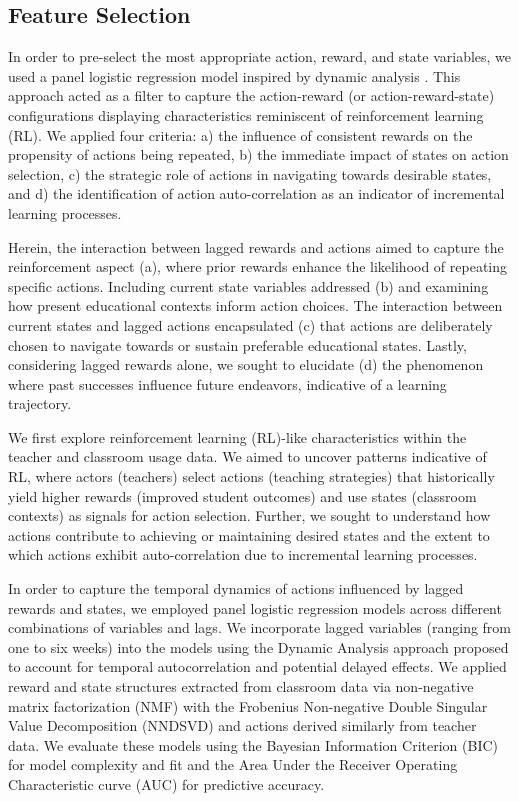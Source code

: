\documentclass[
  number,
  preprint,
  3p,
  onecolumn]{elsarticle}
\begin{document}
\subsection{Feature Selection}\label{feature-selection}

In order to pre-select the most appropriate action, reward, and state
variables, we used a panel logistic regression model inspired by dynamic
analysis \citep{lau2005}. This approach acted as a filter to capture the
action-reward (or action-reward-state) configurations displaying
characteristics reminiscent of reinforcement learning (RL). We applied
four criteria: a) the influence of consistent rewards on the propensity
of actions being repeated, b) the immediate impact of states on action
selection, c) the strategic role of actions in navigating towards
desirable states, and d) the identification of action auto-correlation
as an indicator of incremental learning processes.

Herein, the interaction between lagged rewards and actions aimed to
capture the reinforcement aspect (a), where prior rewards enhance the
likelihood of repeating specific actions. Including current state
variables addressed (b) and examining how present educational contexts
inform action choices. The interaction between current states and lagged
actions encapsulated (c) that actions are deliberately chosen to
navigate towards or sustain preferable educational states. Lastly,
considering lagged rewards alone, we sought to elucidate (d) the
phenomenon where past successes influence future endeavors, indicative
of a learning trajectory.

We first explore reinforcement learning (RL)-like characteristics within
the teacher and classroom usage data. We aimed to uncover patterns
indicative of RL, where actors (teachers) select actions (teaching
strategies) that historically yield higher rewards (improved student
outcomes) and use states (classroom contexts) as signals for action
selection. Further, we sought to understand how actions contribute to
achieving or maintaining desired states and the extent to which actions
exhibit auto-correlation due to incremental learning processes.

In order to capture the temporal dynamics of actions influenced by
lagged rewards and states, we employed panel logistic regression models
across different combinations of variables and lags. We incorporate
lagged variables (ranging from one to six weeks) into the models using
the Dynamic Analysis approach proposed to account for temporal
autocorrelation and potential delayed effects. We applied reward and
state structures extracted from classroom data via non-negative matrix
factorization (NMF) with the Frobenius Non-negative Double Singular
Value Decomposition (NNDSVD) and actions derived similarly from teacher
data. We evaluate these models using the Bayesian Information Criterion
(BIC) for model complexity and fit and the Area Under the Receiver
Operating Characteristic curve (AUC) for predictive accuracy.
\end{document}
